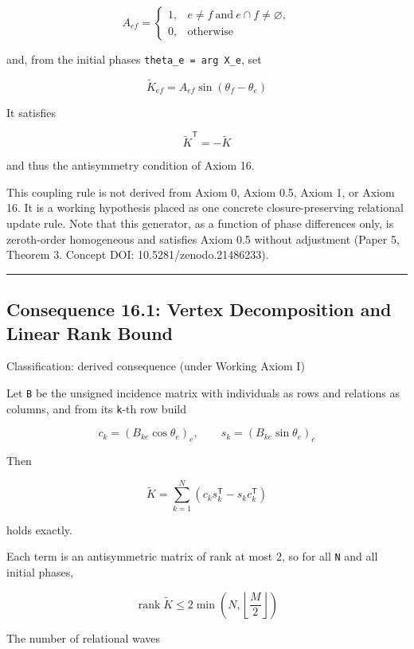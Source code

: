 \documentclass[
  a4paper,
]{article}
\begin{document}
\[
A_{ef}
=
\begin{cases}
1,& e\ne f\ \text{and}\ e\cap f\ne\varnothing,\\
0,& \text{otherwise}
\end{cases}
\]

and, from the initial phases \texttt{theta\_e\ =\ arg\ X\_e}, set

\[
\widetilde K_{ef}
=
A_{ef}\sin(\theta_f-\theta_e)
\]

It satisfies

\[
\widetilde K^{\mathsf T}=-\widetilde K
\]

and thus the antisymmetry condition of Axiom 16.

This coupling rule is not derived from Axiom 0, Axiom 0.5, Axiom 1, or
Axiom 16. It is a working hypothesis placed as one concrete
closure-preserving relational update rule. Note that this generator, as
a function of phase differences only, is zeroth-order homogeneous and
satisfies Axiom 0.5 without adjustment (Paper 5, Theorem 3. Concept DOI:
10.5281/zenodo.21486233).

\begin{center}\rule{0.5\linewidth}{0.5pt}\end{center}

\subsection{Consequence 16.1: Vertex Decomposition and Linear Rank
Bound}\label{consequence-16.1-vertex-decomposition-and-linear-rank-bound}

Classification: derived consequence (under Working Axiom I)

Let \texttt{B} be the unsigned incidence matrix with individuals as rows
and relations as columns, and from its \texttt{k}-th row build

\[
c_k=(B_{ke}\cos\theta_e)_{e},
\qquad
s_k=(B_{ke}\sin\theta_e)_{e}
\]

Then

\[
\widetilde K=\sum_{k=1}^{N}\left(c_k s_k^{\mathsf T}-s_k c_k^{\mathsf T}\right)
\]

holds exactly.

Each term is an antisymmetric matrix of rank at most 2, so for all
\texttt{N} and all initial phases,

\[
\operatorname{rank}\widetilde K
\le
2\min\!\left(N,\left\lfloor\frac{M}{2}\right\rfloor\right)
\]

The number of relational waves
\end{document}
